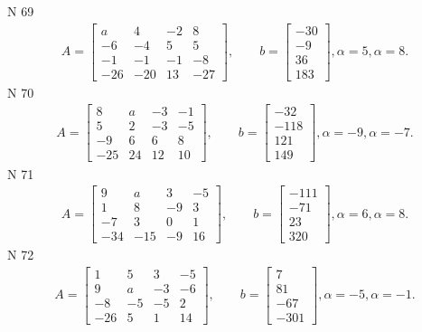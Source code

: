 \documentclass[11pt]{report}
\begin{document}
N 69
\begin{align*}
 A = \left[\begin{matrix}a & 4 & -2 & 8\\-6 & -4 & 5 & 5\\-1 & -1 & -1 & -8\\-26 & -20 & 13 & -27\end{matrix}\right],
    \qquad b = \left[\begin{matrix}-30\\-9\\36\\183\end{matrix}\right], \alpha = 5, \alpha = 8. 
 \end{align*}
N 70
\begin{align*}
 A = \left[\begin{matrix}8 & a & -3 & -1\\5 & 2 & -3 & -5\\-9 & 6 & 6 & 8\\-25 & 24 & 12 & 10\end{matrix}\right],
    \qquad b = \left[\begin{matrix}-32\\-118\\121\\149\end{matrix}\right], \alpha = -9, \alpha = -7. 
 \end{align*}
N 71
\begin{align*}
 A = \left[\begin{matrix}9 & a & 3 & -5\\1 & 8 & -9 & 3\\-7 & 3 & 0 & 1\\-34 & -15 & -9 & 16\end{matrix}\right],
    \qquad b = \left[\begin{matrix}-111\\-71\\23\\320\end{matrix}\right], \alpha = 6, \alpha = 8. 
 \end{align*}
N 72
\begin{align*}
 A = \left[\begin{matrix}1 & 5 & 3 & -5\\9 & a & -3 & -6\\-8 & -5 & -5 & 2\\-26 & 5 & 1 & 14\end{matrix}\right],
    \qquad b = \left[\begin{matrix}7\\81\\-67\\-301\end{matrix}\right], \alpha = -5, \alpha = -1. 
 \end{align*}
\end{document}
